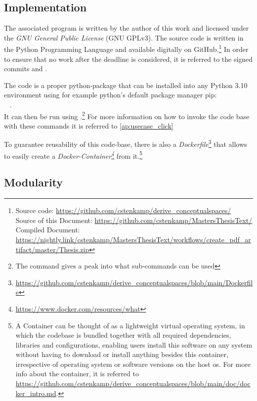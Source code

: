 \subsection{Implementation}

The associated program is written by the author of this work and licensed under the \emph{GNU General Public License} (GNU GPLv3). The source code is written in the Python Programming Language and available digitally on GitHub.\footnote{Source code: \url{https://github.com/cstenkamp/derive_conceptualspaces/}\\Source of this Document: \url{https://github.com/cstenkamp/MastersThesisText/}\\Compiled Document: \url{https://nightly.link/cstenkamp/MastersThesisText/workflows/create_pdf_artifact/master/Thesis.zip}} In order to ensure that no work after the deadline is considered, it is referred to the signed commits  and . 

The code is a proper python-package that can be installed into any Python 3.10 environment using for example python's default package manager pip:\\ ~ .\\ It can then be run using .\footnote{The command  gives a peak into what sub-commands can be used} For more information on how to invoke the code base with these commands it is referred to \autoref{ap:usecase_click}

To guarantee reusability of this code-base, there is also a \emph{Dockerfile}\footnote{{\url{https://github.com/cstenkamp/derive_conceptualspaces/blob/main/Dockerfile}}} that allows to easily create a \emph{Docker-Container\footnote{\url{https://www.docker.com/resources/what}}} from it.\footnote{A Container can be thought of as a lightweight virtual operating system, in which the codebase is bundled together with all required dependencies, libraries and configurations, enabling users install this software on any system without having to download or install anything besides this container, irrespective of operating system or software versions on the host \acrshort{os}. For more info about the container, it is referred to \url{https://github.com/cstenkamp/derive_conceptualspaces/blob/main/doc/docker_intro.md}.}

\subsection{Modularity}


